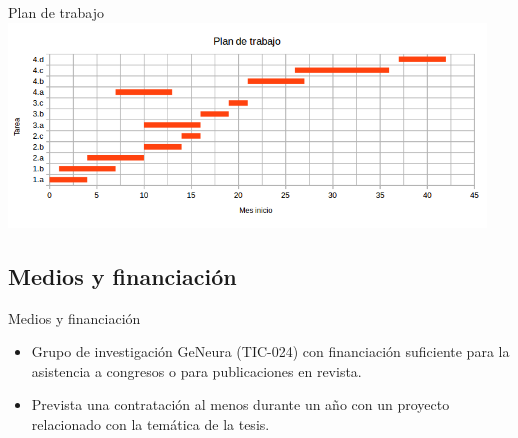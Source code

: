 \documentclass{beamer}
\begin{document}
\begin{frame}{Plan de trabajo}
\includegraphics[width=0.95\textwidth]{./imgs/especiedegantt.png}
\end{frame}

\subsection{Medios y financiación}

\begin{frame}{Medios y financiación}

\begin{itemize}
  \item Grupo de investigación GeNeura (TIC-024) con financiación suficiente para la asistencia a congresos o para publicaciones en revista.
  \item Prevista una contratación al menos durante un año con un proyecto relacionado con la temática de la tesis.
\end{itemize}

\end{frame}
\end{document}
